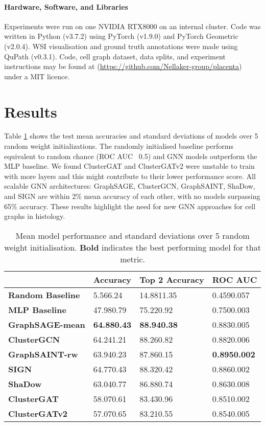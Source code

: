 \documentclass{article}
\begin{document}
\paragraph{Hardware, Software, and Libraries} Experiments were run on one NVIDIA RTX8000 on an internal cluster. Code was written in Python (v3.7.2) using PyTorch (v1.9.0)\cite{paszke_pytorch_2019} and PyTorch Geometric (v2.0.4)\cite{fey_fast_2019}. WSI visualisation and ground truth annotations were made using QuPath (v0.3.1)\cite{peter_bankhead_qupath_2017}. Code, cell graph dataset, data splits, and experiment instructions may be found at (\url{https://github.com/Nellaker-group/placenta}) under a MIT licence.

\label{code}

\section{Results}
\label{results}

Table \ref{model-results} shows the test mean accuracies and standard deviations of models over 5 random weight initializations. The randomly initialised baseline performs equivalent to random chance (ROC AUC ~0.5) and GNN models outperform the MLP baseline. We found ClusterGAT and ClusterGATv2 were unstable to train with more layers and this might contribute to their lower performance score. All scalable GNN architectures: GraphSAGE, ClusterGCN, GraphSAINT, ShaDow, and SIGN are within 2\% mean accuracy of each other, with no models surpassing 65\% accuracy. These results highlight the need for new GNN approaches for cell graphs in histology.

\begin{table}
  \caption{Mean model performance and standard deviations over 5 random weight initialisation. \textbf{Bold} indicates the best performing model for that metric.}
  \label{model-results}
  \centering
  \begin{tabular}{llll}
    \toprule
    & \textbf{Accuracy} & \textbf{Top 2 Accuracy} & \textbf{ROC AUC} \\
    \midrule
    \textbf{Random Baseline} &  5.566.24 & 14.8811.35 & 0.4590.057 \\
    \textbf{MLP Baseline} &     47.980.79 & 75.220.92 & 0.7500.003 \\
    \textbf{GraphSAGE-mean} &   \textbf{64.880.43} & \textbf{88.940.38} & 0.8830.005 \\
    \textbf{ClusterGCN} &       64.241.21 & 88.260.82 & 0.8820.006 \\
    \textbf{GraphSAINT-rw} &    63.940.23 & 87.860.15 & \textbf{0.8950.002} \\
    \textbf{SIGN} &             64.770.43 & 88.320.42 & 0.8860.002 \\
    \textbf{ShaDow} &           63.040.77 & 86.880.74 & 0.8630.008 \\
    \textbf{ClusterGAT} &       58.070.61 & 83.430.96 & 0.8510.002 \\
    \textbf{ClusterGATv2} &     57.070.65 & 83.210.55 & 0.8540.005\\
    \bottomrule
  \end{tabular}
\end{table}
\end{document}
